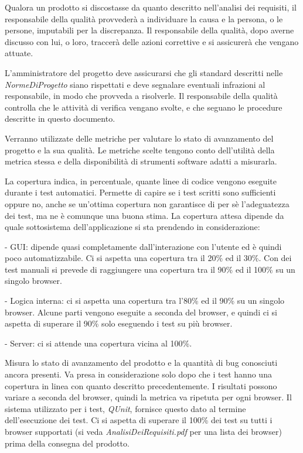Qualora un prodotto si discostasse da quanto descritto nell'analisi dei requisiti, il responsabile della qualit\`a provveder\`a a individuare la causa e la persona, o le persone, imputabili per la discrepanza. Il responsabile della qualit\`a, dopo averne discusso con lui, o loro, traccer\`a delle azioni correttive e si assicurer\`a che vengano attuate.
 
L'amministratore del progetto deve assicurarsi che gli standard descritti nelle \textit{NormeDiProgetto} siano rispettati e deve segnalare eventuali infrazioni al responsabile, in modo che provveda a risolverle. Il responsabile della qualit\`a controlla che le attivit\`a di verifica vengano svolte, e che seguano le procedure descritte in questo documento.
\newpage
 

Verranno utilizzate delle metriche per valutare lo stato di avanzamento del progetto e la sua qualit\`a. 
Le metriche scelte tengono conto dell'utilit\`a della metrica stessa e della disponibilit\`a di strumenti software
adatti a misurarla.

La copertura indica, in percentuale, quante linee di codice vengono eseguite durante i test automatici. Permette di capire se i test scritti sono sufficienti oppure no, anche se un'ottima copertura non garantisce di per s\`e l'adeguatezza dei test, ma ne \`e comunque una buona stima. La copertura attesa dipende da quale sottosistema dell'applicazione si sta prendendo in considerazione:
\begin{elencopuntato}[\subsecindent]
\item[-] GUI: dipende quasi completamente dall'interazione con l'utente ed \`e quindi poco automatizzabile. Ci si aspetta una copertura tra il 20\% ed il 30\%. Con dei test manuali si prevede di raggiungere una copertura tra il 90\% ed il 100\% su un singolo browser. 
\item[-] Logica interna: ci si aspetta una copertura tra l'80\% ed il 90\% su un singolo browser. Alcune parti vengono eseguite a seconda del browser, e quindi ci si aspetta di superare il 90\% solo eseguendo i test su pi\`u browser.
\item[-] Server: ci si attende una copertura vicina al 100\%.
\end{elencopuntato}

Misura lo stato di avanzamento del prodotto e la quantit\`a di bug conosciuti ancora presenti. Va presa in considerazione solo dopo che i test hanno una copertura in linea con quanto descritto precedentemente. I risultati possono variare a seconda del browser, quindi la metrica va ripetuta per ogni browser. Il sistema utilizzato per i test, \textit{QUnit}, fornisce questo dato al termine dell'esecuzione dei test. Ci si aspetta di superare il 100\% dei test su tutti i browser supportati (si veda \textit{AnalisiDeiRequisiti.pdf} per una lista dei browser) prima della consegna del prodotto.

